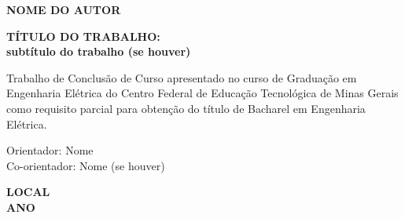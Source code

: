 \thispagestyle{empty}

\begin{center}

{\large \textbf{NOME DO AUTOR}}

\vspace{6cm}

{\large \textbf{TÍTULO DO TRABALHO: \\ \vspace{0.5 cm} subtítulo do trabalho (se houver)}} \\
\vspace{0.7 cm}
\end{center}

\hspace{6.5cm}\begin{minipage}{8 cm}
     \nohyphens{Trabalho de Conclusão de Curso apresentado no curso de Graduação em Engenharia Elétrica do Centro Federal de Educação Tecnológica de Minas Gerais como requisito parcial para obtenção do título de Bacharel em Engenharia Elétrica.}

    \vspace{0.6 cm}

    Orientador: Nome \\
    Co-orientador: Nome (se houver)
\end{minipage}
\vspace{4 cm}


\vspace{3cm}
\begin{center}
{\large \textbf{LOCAL}} \\
{\large \textbf{ANO}}
\end{center}
